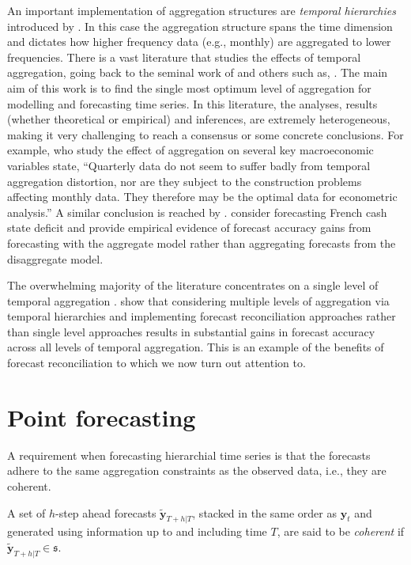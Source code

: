 \documentclass[graybox]{svmult}
\begin{document}
An important implementation of aggregation structures are \textit{temporal hierarchies} introduced by \cite{AthEtAl2017}. In this case the aggregation structure spans the time dimension and dictates how higher frequency data (e.g., monthly) are aggregated to lower frequencies. There is a vast literature that studies the effects of temporal aggregation, going back to the seminal work of \cite{ZelMon1971, AmeWu1972, Tia1972, Bre1973} and others such as, \cite{Hot1993, HotCar1993, Mar1999, SilEtAl2008}. The main aim of this work is to find the single most optimum level of aggregation for modelling and forecasting time series. In this literature, the analyses, results (whether theoretical or empirical) and inferences, are extremely heterogeneous, making it very challenging to reach a consensus or some concrete conclusions. For example, \cite{RosSea1995} who study the effect of aggregation on several key macroeconomic variables state, ``Quarterly data do not seem to suffer badly from temporal aggregation distortion, nor are they subject to the construction problems affecting monthly data. They therefore may be the optimal data for econometric analysis.'' A similar conclusion is reached by \cite{NijPal1990}. \cite{SilEtAl2008} consider forecasting French cash state deficit and provide empirical evidence of forecast accuracy gains from forecasting with the aggregate model rather than aggregating forecasts from the disaggregate model.

The overwhelming majority of the literature concentrates on a single level of temporal aggregation \citep[there are some notable exceptions such as,][]{AndEtAl2011,KouEtAl2014}. \cite{AthEtAl2017} show that considering multiple levels of aggregation via temporal hierarchies and implementing forecast reconciliation approaches rather than single level approaches results in substantial gains in forecast accuracy across all levels of temporal aggregation. This is an example of the benefits of forecast reconciliation to which we now turn out attention to.

\clearpage
\section{Point forecasting}\label{sec:point forecasting}

A requirement when forecasting hierarchial time series is that the forecasts adhere to the same aggregation constraints as the observed data, i.e., they are coherent.

\begin{definition}
A set of $h$-step ahead forecasts $\tilde{\bm{y}}_{T+h|T}$, stacked in the same order as $\bm{y}_{t}$ and generated using information up to and including time $T$,
are said to be \textit{coherent} if $\tilde{\bm{y}}_{T+h|T} \in \mathfrak{s}$.
  \label{def:coherence}
\end{definition}
\end{document}
